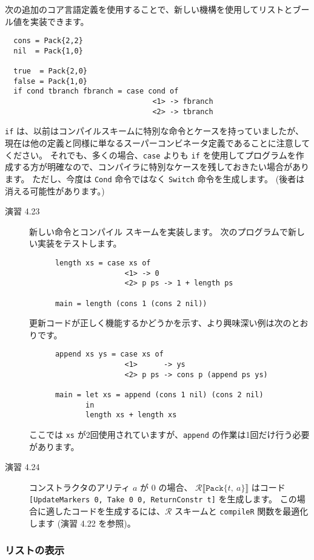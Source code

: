 \documentclass{jarticle}
\begin{document}
次の追加のコア言語定義を使用することで、新しい機構を使用してリストとブール値を実装できます。

\begin{verbatim}
  cons = Pack{2,2}
  nil  = Pack{1,0}

  true  = Pack{2,0}
  false = Pack{1,0}
  if cond tbranch fbranch = case cond of
                                  <1> -> fbranch
                                  <2> -> tbranch
\end{verbatim}

\texttt{if} は、以前はコンパイルスキームに特別な命令とケースを持っていましたが、現在は他の定義と同様に単なるスーパーコンビネータ定義であることに注意してください。
それでも、多くの場合、\texttt{case} よりも \texttt{if} を使用してプログラムを作成する方が明確なので、コンパイラに特別なケースを残しておきたい場合があります。
ただし、今度は \texttt{Cond} 命令ではなく \texttt{Switch} 命令を生成します。
(後者は消える可能性があります。)

\begin{description}
	\item[演習 4.23] 新しい命令とコンパイル スキームを実装します。
		次のプログラムで新しい実装をテストします。
		\begin{verbatim}
      length xs = case xs of
                      <1> -> 0
                      <2> p ps -> 1 + length ps

      main = length (cons 1 (cons 2 nil))
    \end{verbatim}
		更新コードが正しく機能するかどうかを示す、より興味深い例は次のとおりです。
		\begin{verbatim}
      append xs ys = case xs of
                      <1>      -> ys
                      <2> p ps -> cons p (append ps ys)

      main = let xs = append (cons 1 nil) (cons 2 nil)
             in
             length xs + length xs
    \end{verbatim}
		ここでは \texttt{xs} が2回使用されていますが、\texttt{append} の作業は1回だけ行う必要があります。
	\item[演習 4.24] コンストラクタのアリティ $a$ が 0 の場合、
		$\mathcal{R} \llbracket \texttt{Pack\{} t, ~ a \texttt{\}} \rrbracket$ はコード \texttt{[UpdateMarkers 0, Take 0 0, ReturnConstr t]} を生成します。
		この場合に適したコードを生成するには、$\mathcal{R}$ スキームと \texttt{compileR} 関数を最適化します (演習 4.22 を参照)。
\end{description}

\subsubsection{リストの表示}
\end{document}
